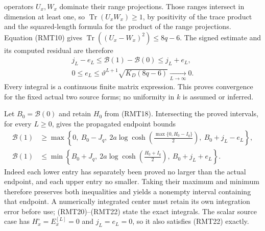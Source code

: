 operators \(U_x,W_x\) dominate their range projections.
Those ranges intersect in dimension at least one, so
\(\operatorname{Tr}(U_xW_x)\geq1\), by positivity of the
trace product and the squared-length formula for the
product of the range projections.  Equation (RMT10) gives
\(\operatorname{Tr}((U_x-W_x)^2)\leq8q-6\).
The signed estimate and its computed residual are therefore
\[
 \begin{gathered}
 j_L-e_L\leq\mathcal B(1)-\mathcal B(0)\leq j_L+e_L,\\
 0\leq e_L\leq
       \vartheta^{L+1}\sqrt{K_D(8q-6)}
          \xrightarrow[L\to\infty]{}0 .
 \end{gathered}
 \tag{RMT21}
\]
Every integral is a continuous finite matrix expression.
This proves convergence for the fixed actual two source
forms; no uniformity in \(k\) is assumed or inferred.

Let \(B_0=\mathcal B(0)\) and retain \(H_0\) from (RMT18).
Intersecting the proved intervals, for every \(L\geq0\),
gives the propagated endpoint bounds
\[
 \begin{split}
 \mathcal B(1)&\geq
 \max\left\{0,\ B_0-J_q,\
       2a\log\cosh\left(\frac{\max\{0,H_0-I_q\}}2\right),\
       B_0+j_L-e_L\right\},\\
 \mathcal B(1)&\leq
 \min\left\{B_0+J_q,\
       2a\log\cosh\left(\frac{H_0+I_q}2\right),\
       B_0+j_L+e_L\right\}.
 \end{split}
 \tag{RMT22}
\]
Indeed each lower entry has separately been proved no
larger than the actual endpoint, and each upper entry no
smaller.  Taking their maximum and minimum therefore
preserves both inequalities and yields a nonempty
interval containing that endpoint.  A numerically
integrated center must retain its own integration
error before use; (RMT20)--(RMT22) state the exact
integrals.  The scalar source case has
\(H_x^\circ=E_x^{[L]}=0\) and \(j_L=e_L=0\),
so it also satisfies (RMT22) exactly.
